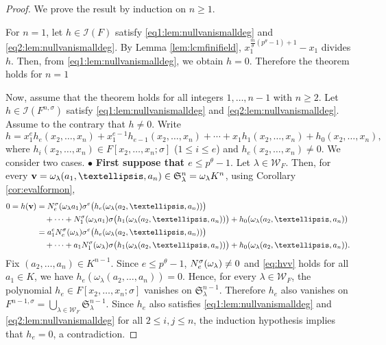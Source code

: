\documentclass[10pt,a4paper]{amsart}
\begin{document}
\begin{proof}
We prove the result by induction on $n \geq 1$. 

For $n=1$, let $h \in \mathscr{I}(F)$ satisfy \eqref{eq1:lem:nullvanismalldeg} and \eqref{eq2:lem:nullvanismalldeg}. By Lemma \ref{lem:lcmfinifield}, $x_1^{\frac{m}{\theta}(p^\theta-1)+1}-x_1$ divides $h$. Then, from \eqref{eq1:lem:nullvanismalldeg}, we obtain $h=0$. Therefore the theorem holds for $n=1$

Now, assume that the theorem holds for all integers $1,\dots,n-1$ with $n \geq 2$. Let $h \in \mathscr{I}(F^{n,\sigma})$ satisfy \eqref{eq1:lem:nullvanismalldeg} and \eqref{eq2:lem:nullvanismalldeg}. Assume to the contrary that $h \neq 0$. Write 
$$h=x_1^e h_{e}(x_2,\dots,x_n)+x_1^{e-1} h_{e-1}(x_2,\dots,x_n)+\cdots+x_1 h_{1}(x_2,\dots,x_n)+ h_{0}(x_2,\dots,x_n),
$$ where $h_i(x_2,\dots,x_n) \in F[x_2,\dots,x_n;\sigma]$ ($1 \leq i \leq e$) and $h_e(x_2,\dots,x_n)\neq 0$. We consider two cases.
\vskip 1mm
\noindent
$\bullet$ {\bf First suppose that $e\leq p^\theta-1$}. Let $\lambda \in \mathscr{W}_F$. Then, for every ${\bf v}=\omega_\lambda (a_1,\dots,a_n)\in \mathfrak{S}_{\lambda}^n= \omega_\lambda K^n$, using Corollary \ref{cor:evalformon},
\begin{equation}\label{eq:hvv}
\begin{aligned}
0=h({\bf v})
&={\rm N}^\sigma_e(\omega_\lambda a_1)
  \sigma^e\big(h_e(\omega_\lambda(a_2,\dots,a_n))\big)\\
&\quad+\cdots+{\rm N}^\sigma_1(\omega_\lambda a_1)
  \sigma\big(h_1(\omega_\lambda(a_2,\dots,a_n))\big)
  +h_0(\omega_\lambda(a_2,\dots,a_n))\\
&=a_1^e {\rm N}^\sigma_e(\omega_\lambda)
  \sigma^e\big(h_e(\omega_\lambda(a_2,\dots,a_n))\big)\\
&\quad+\cdots+a_1{\rm N}^\sigma_1(\omega_\lambda)
  \sigma\big(h_1(\omega_\lambda(a_2,\dots,a_n))\big)
  +h_0(\omega_\lambda(a_2,\dots,a_n)).
\end{aligned}
\end{equation} Fix $(a_2,\dots,a_n) \in K^{n-1}$. Since $e \leq p^\theta-1$, ${\rm N}^\sigma_e(\omega_\lambda) \neq 0$ and \eqref{eq:hvv} holds for all $a_1 \in K$, we have $h_e(\omega_{\lambda}(a_2,\dots,a_n))=0$. Hence, for every $\lambda \in \mathscr{W}_F$, the polynomial $h_e \in F[x_2,\dots,x_n;\sigma]$ vanishes on $\mathfrak{S}_{\lambda}^{n-1}$. Therefore $h_e$ also vanishes on $F^{n-1,\sigma}=\bigcup_{\lambda \in \mathscr{W}_F} \mathfrak{S}_{\lambda}^{n-1}$. Since $h_e$ also satisfies \eqref{eq1:lem:nullvanismalldeg} and \eqref{eq2:lem:nullvanismalldeg} for all $2 \leq i,j \leq n$, the induction hypothesis implies that $h_e=0$, a contradiction.

\end{proof}
\end{document}
